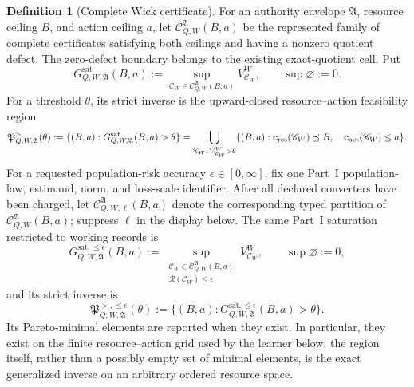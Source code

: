 \documentclass[11pt]{article}
\numberwithin{section}{part}
\theoremstyle{plain}
\theoremstyle{definition}
\newtheorem{definition}[definition]{Definition}
\theoremstyle{remark}
\begin{document}
\begin{definition}[Complete Wick certificate]
For an authority envelope \(\mathfrak A\), resource ceiling \(B\), and
action ceiling \(a\), let \(\mathcal C_{Q,W}^{\mathfrak A}(B,a)\) be the
represented family of complete certificates satisfying both ceilings and
having a nonzero quotient defect.  The zero-defect boundary belongs to the
existing exact-quotient cell.  Put
\begin{equation}
 \label{eq:wick-saturated-profile}
 G_{Q,W,\mathfrak A}^{\mathrm{sat}}(B,a)
 :=\sup_{\mathscr C_W\in\mathcal C_{Q,W}^{\mathfrak A}(B,a)}
 V^W_{\mathscr C_W},
 \qquad \sup\varnothing:=0.
\end{equation}
For a threshold \(\theta\), its strict inverse is the upward-closed
resource--action feasibility region
\begin{equation}
 \label{eq:wick-strict-inverse}
 \mathfrak P_{Q,W,\mathfrak A}^{>}(\theta)
 :=\{(B,a):G_{Q,W,\mathfrak A}^{\mathrm{sat}}(B,a)>\theta\}
 =\bigcup_{\substack{\mathscr C_W:\,
                V^W_{\mathscr C_W}>\theta}}
   \{(B,a):\mathbf c_{\rm res}(\mathscr C_W)\preceq B,\quad
              \mathbf c_{\rm act}(\mathscr C_W)\le a\}.
\end{equation}
For a requested population-risk accuracy \(\epsilon\in[0,\infty]\), fix one
Part~I population-law, estimand, norm, and loss-scale identifier.  After all
declared converters have been charged, let
\(\mathcal C_{Q,W,\ell}^{\mathfrak A}(B,a)\) denote the corresponding typed
partition of \(\mathcal C_{Q,W}^{\mathfrak A}(B,a)\); suppress \(\ell\) in
the display below.  The same Part~I saturation restricted to working records
is
\begin{equation}
 \label{eq:wick-risk-qualified-saturated-profile}
 G_{Q,W,\mathfrak A}^{\mathrm{sat},\le\epsilon}(B,a)
 :=\sup_{\substack{\mathscr C_W\in
                    \mathcal C_{Q,W}^{\mathfrak A}(B,a)\\
                    \mathcal R(\mathscr C_W)\le\epsilon}}
       V^W_{\mathscr C_W},
 \qquad \sup\varnothing:=0,
\end{equation}
and its strict inverse is
\begin{equation}
 \label{eq:wick-risk-qualified-strict-inverse}
 \mathfrak P_{Q,W,\mathfrak A}^{>,\le\epsilon}(\theta)
 :=\{(B,a):
 G_{Q,W,\mathfrak A}^{\mathrm{sat},\le\epsilon}(B,a)>\theta\}.
\end{equation}
Its Pareto-minimal elements are reported when they exist.  In particular,
they exist on the finite resource--action grid used by the learner below;
the region itself, rather than a possibly empty set of minimal elements, is
the exact generalized inverse on an arbitrary ordered resource space.
\end{definition}
\end{document}

